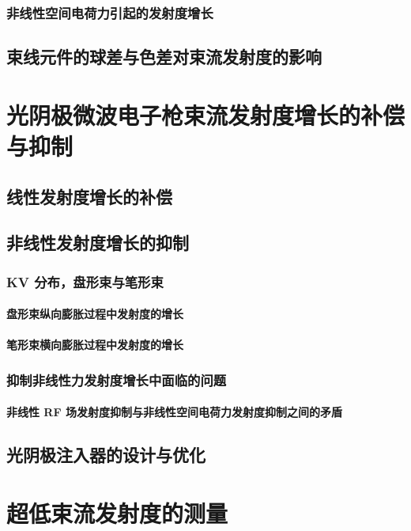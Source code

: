 \subsubsection{非线性空间电荷力引起的发射度增长}

\subsection{束线元件的球差与色差对束流发射度的影响}

\section{光阴极微波电子枪束流发射度增长的补偿与抑制}

\subsection{线性发射度增长的补偿}

\subsection{非线性发射度增长的抑制}

\subsubsection{KV 分布，盘形束与笔形束}

\paragraph{盘形束纵向膨胀过程中发射度的增长}

\paragraph{笔形束横向膨胀过程中发射度的增长}

\subsubsection{抑制非线性力发射度增长中面临的问题}

\paragraph{非线性 RF 场发射度抑制与非线性空间电荷力发射度抑制之间的矛盾}

\subsection{光阴极注入器的设计与优化}

\section{超低束流发射度的测量}

